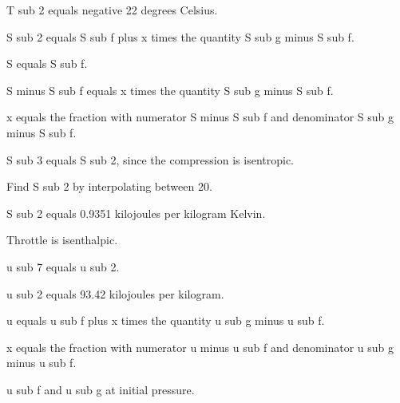 T sub 2 equals negative 22 degrees Celsius.

S sub 2 equals S sub f plus x times the quantity S sub g minus S sub f.

S equals S sub f.

S minus S sub f equals x times the quantity S sub g minus S sub f.

x equals the fraction with numerator S minus S sub f and denominator S sub g minus S sub f.

S sub 3 equals S sub 2, since the compression is isentropic.

Find S sub 2 by interpolating between 20.

S sub 2 equals 0.9351 kilojoules per kilogram Kelvin.

Throttle is isenthalpic.

u sub 7 equals u sub 2.

u sub 2 equals 93.42 kilojoules per kilogram.

u equals u sub f plus x times the quantity u sub g minus u sub f.

x equals the fraction with numerator u minus u sub f and denominator u sub g minus u sub f.

u sub f and u sub g at initial pressure.
